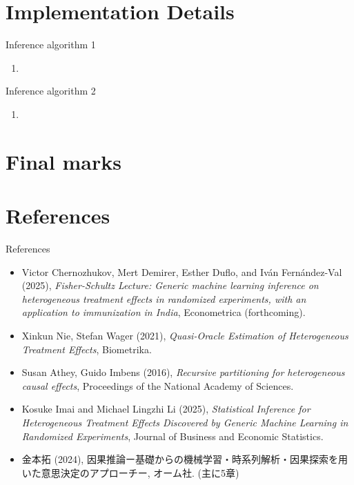 \documentclass[xcolor=svgnames,aspectratio=169]{beamer}
\begin{document}
\section{Implementation Details}

\begin{frame}{Inference algorithm 1}
    \begin{enumerate}
        \item 
    \end{enumerate}
\end{frame}

\begin{frame}{Inference algorithm 2}
    \begin{enumerate}
        \item 
    \end{enumerate}
\end{frame}

\section{Final marks}

\section{References}

\begin{frame}{References}
    \begin{itemize}
        \item Victor Chernozhukov, Mert Demirer, Esther Duflo, and Iván Fernández-Val (2025), \textit{Fisher-Schultz Lecture: Generic machine learning inference on heterogeneous treatment effects in randomized experiments, with an application to immunization in India}, Econometrica (forthcoming).
        \item Xinkun Nie, Stefan Wager (2021), \textit{Quasi-Oracle Estimation of Heterogeneous Treatment Effects}, Biometrika.
        \item Susan Athey, Guido Imbens (2016), \textit{Recursive partitioning for heterogeneous causal effects}, Proceedings of the National Academy of Sciences. 
        \item Kosuke Imai and Michael Lingzhi Li (2025), \textit{Statistical Inference for Heterogeneous Treatment Effects Discovered by Generic Machine Learning in Randomized Experiments}, Journal of Business and Economic Statistics. 
        \item 金本拓 (2024), 因果推論ー基礎からの機械学習・時系列解析・因果探索を用いた意思決定のアプローチー, オーム社. (主に5章)
    \end{itemize}
\end{frame}
\end{document}
